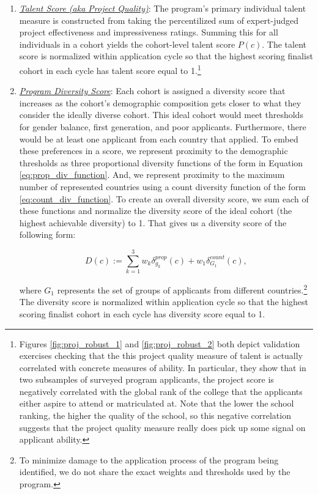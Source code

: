 \begin{enumerate}
\item \underline{\emph{Talent Score (aka Project Quality)}}: The program’s primary individual talent measure is constructed from taking the percentilized sum of expert-judged project effectiveness and impressiveness ratings. Summing this for all individuals in a cohort yields the cohort-level talent score $P(c)$. The talent score is normalized within application cycle so that the highest scoring finalist cohort in each cycle has talent score equal to 1.\footnote{Figures \ref{fig:proj_robust_1} and \ref{fig:proj_robust_2} both depict validation exercises checking that the this project quality measure of talent is actually correlated with concrete measures of ability. In particular, they show that in two subsamples of surveyed program applicants, the project score is negatively correlated with the global rank of the college that the applicants either aspire to attend or matriculated at. Note that the lower the school ranking, the higher the quality of the school, so this negative correlation suggests that the project quality measure really does pick up some signal on applicant ability.}

\item \underline{\emph{Program Diversity Score}}: Each cohort is assigned a diversity score that increases as the cohort's demographic composition gets closer to what they consider the ideally diverse cohort. This ideal cohort would meet thresholds for gender balance, first generation, and poor applicants. Furthermore, there would be at least one applicant from each country that applied. To embed these preferences in a score, we represent proximity to the demographic thresholds as three proportional diversity functions of the form in Equation \ref{eq:prop_div_function}. And, we represent proximity to the maximum number of represented countries using a count diversity function of the form \ref{eq:count_div_function}. To create an overall diversity score, we sum each of these functions and normalize the diversity score of the ideal cohort (the highest achievable diversity) to 1. That gives us a diversity score of the following form: 

\begin{equation}
D(c) := \sum_{k = 1}^3w_k\delta_{g_k}^{prop}(c) + w_1\delta_{G_1}^{count}(c),
\end{equation}

\noindent where $G_1$ represents the set of groups of applicants from different countries.\footnote{To minimize damage to the application process of the program being identified, we do not share the exact weights and thresholds used by the program.} The diversity score is normalized within application cycle so that the highest scoring finalist cohort in each cycle has diversity score equal to 1. 


\end{enumerate}
